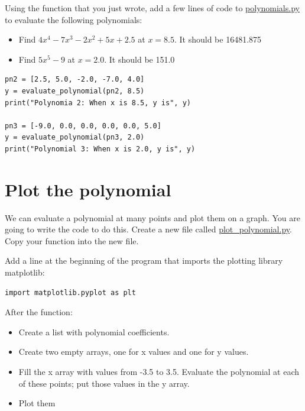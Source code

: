 \begin{Exercise}[title={Evaluate Polynomials}, label=pyevalpolynomials]
Using the function that you just wrote, add a few lines of code to \url{polynomials.py} to evaluate the following polynomials:
\begin{itemize}
\item Find $4x^4 - 7x^3 - 2x^2 + 5x + 2.5$ at $x = 8.5$.  It should be 16481.875
\item Find $5x^5 - 9$ at $x = 2.0$.  It should be 151.0
\end{itemize}
\end{Exercise}
\begin{Answer}[ref=pyevalpolynomials]
\begin{Verbatim}
pn2 = [2.5, 5.0, -2.0, -7.0, 4.0]
y = evaluate_polynomial(pn2, 8.5)
print("Polynomia 2: When x is 8.5, y is", y)

pn3 = [-9.0, 0.0, 0.0, 0.0, 0.0, 5.0]
y = evaluate_polynomial(pn3, 2.0)
print("Polynomial 3: When x is 2.0, y is", y)    
\end{Verbatim} 
\end{Answer}

\section{Plot the polynomial}

We can evaluate a polynomial at many points and plot them on a
graph. You are going to write the code to do this.  Create a new file
called \url{plot_polynomial.py}. Copy your 
function into the new file.

Add a line at the beginning of the program that imports the plotting library matplotlib:
\begin{Verbatim}
import matplotlib.pyplot as plt
\end{Verbatim}

After the  function:
\begin{itemize}
\item Create a list with polynomial coefficients.
\item Create two empty arrays, one for x values and one for y values.
\item Fill the x array with values from -3.5 to 3.5. Evaluate the polynomial at each of these points; put those values
  in the y array.
\item Plot them
\end{itemize}

